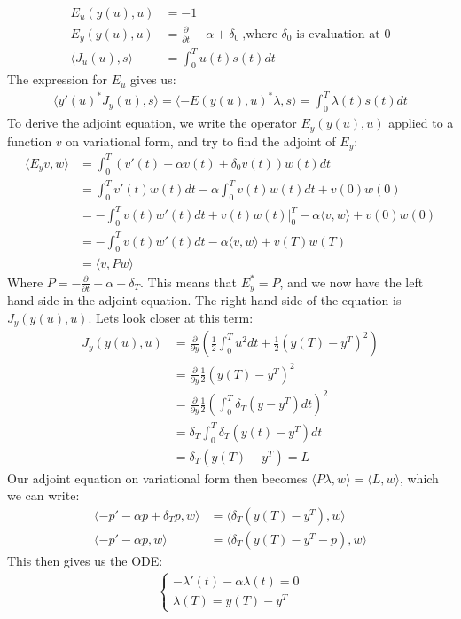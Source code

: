 \documentclass[11pt,a4paper]{report}
\begin{document}
\begin{align}
E_u(y(u),u)&=-1 \\
E_y(y(u),u)&=\frac{\partial}{\partial t} - \alpha + \delta_0 \ \text{,where $\delta_0$ is evaluation at 0} \\
\langle J_u(u),s\rangle &= \int_0^T u(t)s(t) dt 
\end{align}
The expression for $E_u$ gives us:
\begin{align}
\langle y'(u)^*J_y(u),s\rangle = \langle -E(y(u),u)^*\lambda,s\rangle =\int_0^T \lambda(t)s(t)dt
\end{align}
To derive the adjoint equation, we write the operator $E_y(y(u),u)$ applied to a function $v$ on variational form, and try to find the adjoint of $E_y$: 
\begin{align}
\langle E_yv,w \rangle &=  \int_0^T(v'(t)-\alpha v(t)+\delta_0v(t))w(t)dt \\ &= \int_0^Tv'(t)w(t)dt -\alpha\int_0^Tv(t)w(t) dt +v(0)w(0) \\
& = -\int_0^Tv(t)w'(t)dt +v(t)w(t)|_0^T-\alpha\langle v,w\rangle +v(0)w(0) \\
&=-\int_0^Tv(t)w'(t)dt -\alpha\langle v,w\rangle +v(T)w(T) \\
&= \langle v,Pw \rangle
\end{align} 
Where $P=-\frac{\partial}{\partial t} -\alpha + \delta_T$. This means that $E_y^* = P$, and we now have the left hand side in the adjoint equation. The right hand side of the equation is $J_y(y(u),u)$. Lets look closer at this term:
\begin{align}
J_y(y(u),u) &= \frac{\partial}{\partial y}(\frac{1}{2}\int_0^Tu^2dt + \frac{1}{2}(y(T)-y^T)^2) \\ &= \frac{\partial}{\partial y} \frac{1}{2}(y(T)-y^T)^2 \\
&= \frac{\partial}{\partial y}\frac{1}{2}(\int_0^T \delta_T(y-y^T)dt)^2 \\
&= \delta_T\int_0^T \delta_T(y(t)-y^T)dt \\
&= \delta_T(y(T)-y^T)=L
\end{align}
Our adjoint equation on variational form then becomes $\langle P\lambda,w\rangle = \langle L,w\rangle$, which we can write: 
\begin{align}
\langle -p'-\alpha p +\delta_Tp,w \rangle &= \langle \delta_T(y(T)-y^T),w\rangle \\
\langle -p'-\alpha p ,w \rangle &= \langle \delta_T(y(T)-y^T -p),w\rangle
\end{align}
This then gives us the ODE:
\begin{align}
   \left\{
     \begin{array}{lr}
       -\lambda'(t) -\alpha\lambda(t)=0  \\
       \lambda(T) = y(T)-y^T
     \end{array}
   \right.
\end{align}
\end{document}
